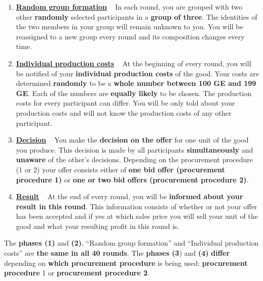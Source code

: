 \documentclass[11pt]{article}
\begin{document}
\begin{enumerate}[label=\textbf{\upshape(\arabic*\upshape)}]
	\item \textbf{\underline{Random group formation}} ~\smallbreak
		In each round, you are grouped with two other \textbf{randomly} selected participants in a \textbf{group of three}. The identities of the two members in your group will remain unknown to you. You will be reassigned to a new group every round and its composition changes every time.
	\item \textbf{\underline{Individual production costs}} ~\smallbreak
		At the beginning of every round, you will be notified of your \textbf{individual production costs} of the good. Your costs are determined \textbf{randomly} to be a \textbf{whole number between 100 GE and 199 GE}. Each of the numbers are \textbf{equally likely} to be chosen. The production costs for every participant can differ. You will be only told about your production costs and will not know the production costs of any other participant.
	\item \textbf{\underline{Decision}} ~\smallbreak
		You make the \textbf{decision on the offer} for one unit of the good you produce. This decision is made by all participants \textbf{simultaneously} and \textbf{unaware} of the other’s decisions. Depending on the procurement procedure (1 or 2) your offer consists either of \textbf{one bid offer (procurement procedure 1)} or \textbf{one or two bid offers (procurement procedure 2)}.
	\item \textbf{\underline{Result}}  ~\smallbreak
		At the end of every round, you will be \textbf{informed about your result in this round}. This information consists of whether or not your offer has been accepted and if yes at which sales price you will sell your unit of the good and what your resulting profit in this round is.		
\end{enumerate}

The \textbf{phases (1)} and \textbf{(2)}, \enquote{Random group formation} and \enquote{Individual production costs} are \textbf{the same in all 40 rounds}. The \textbf{phases (3}) and \textbf{(4)} \textbf{differ} depending on \textbf{which procurement procedure} is being used: \textbf{procurement procedure }1 or \textbf{procurement procedure 2}.

\end{document}
